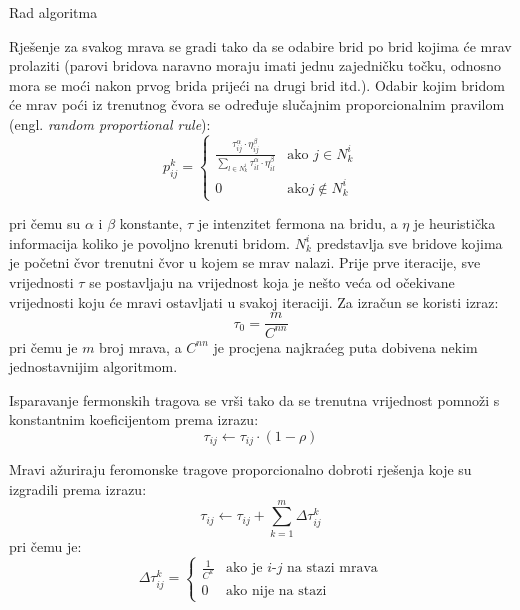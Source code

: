 \documentclass[times, utf8, zavrsni]{fer}
\begin{document}
\begin{algorithm}
  \caption{Rad algoritma}
  \label{algo:rad_algoritma}
  \begin{algorithmic}
  \REPEAT
    \ENDFOR

    \ENDFOR

  \end{algorithmic}
\end{algorithm}

Rješenje za svakog mrava se gradi tako da se odabire brid po brid kojima će mrav prolaziti (parovi bridova naravno moraju imati jednu
zajedničku točku, odnosno mora se moći nakon prvog brida prijeći na drugi brid itd.). Odabir kojim bridom će mrav poći iz trenutnog čvora
se određuje slučajnim proporcionalnim pravilom (engl. \textit{random proportional rule}):
\[
  p^k_{ij} =
  \begin{cases}
    \frac{\tau^\alpha_{ij}\cdot\eta^\beta_{ij}}{\sum_{l \in N^i_k}\tau^\alpha_{il}\cdot\eta^\beta_{il} } & \text{ako $j \in N^i_k$} \\
    0 & \text{ako} j \notin N^i_k
  \end{cases}
\]

pri čemu su $\alpha$ i $\beta$ konstante, $\tau$ je intenzitet fermona na bridu, a $\eta$ je heuristička informacija koliko je povoljno krenuti
 bridom. $N^i_k$ predstavlja sve bridove kojima je početni čvor trenutni čvor u kojem se mrav nalazi. Prije prve iteracije,
 sve vrijednosti $\tau$ se postavljaju na vrijednost koja je nešto veća od očekivane vrijednosti koju će mravi ostavljati u svakoj iteraciji. Za izračun se koristi izraz:
$$
\tau_0 = \frac{m}{C^{nn}}
$$
pri čemu je $m$ broj mrava, a $C^{nn}$ je procjena najkraćeg puta dobivena nekim jednostavnijim algoritmom.

Isparavanje fermonskih tragova se vrši tako da se trenutna vrijednost pomnoži s konstantnim koeficijentom prema izrazu:
$$
\tau_{ij} \leftarrow \tau_{ij} \cdot (1 - \rho)
$$

Mravi ažuriraju feromonske tragove proporcionalno dobroti rješenja koje su izgradili prema izrazu:
$$
\tau_{ij} \leftarrow \tau_{ij} + \sum^m_{k=1} \Delta \tau^k_{ij}
$$
pri čemu je:
$$
\Delta \tau^k_{ij} =
\begin{cases}
  \frac{1}{C^k} & \text{ako je $i$-$j$ na stazi mrava} \\
  0 & \text{ako nije na stazi}
\end{cases}
$$
\end{document}

